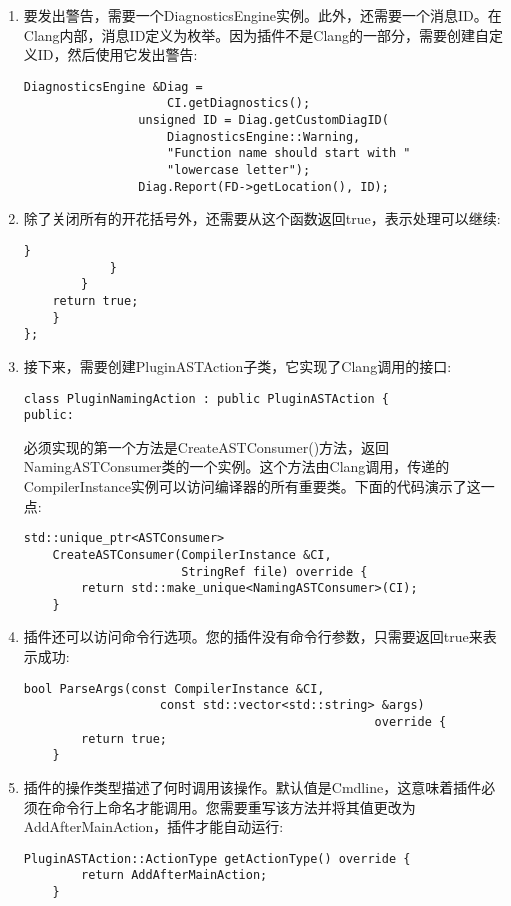 \begin{enumerate}
\item 要发出警告，需要一个DiagnosticsEngine实例。此外，还需要一个消息ID。在Clang内部，消息ID定义为枚举。因为插件不是Clang的一部分，需要创建自定义ID，然后使用它发出警告:
\begin{lstlisting}[caption={}]
				DiagnosticsEngine &Diag =
					CI.getDiagnostics();
				unsigned ID = Diag.getCustomDiagID(
					DiagnosticsEngine::Warning,
					"Function name should start with "
					"lowercase letter");
				Diag.Report(FD->getLocation(), ID);
\end{lstlisting}

\item 除了关闭所有的开花括号外，还需要从这个函数返回true，表示处理可以继续:
\begin{lstlisting}[caption={}]
				}
			}
		}
	return true;
	}
};
\end{lstlisting}

\item 接下来，需要创建PluginASTAction子类，它实现了Clang调用的接口:
\begin{lstlisting}[caption={}]
class PluginNamingAction : public PluginASTAction {
public:
\end{lstlisting}
必须实现的第一个方法是CreateASTConsumer()方法，返回NamingASTConsumer类的一个实例。这个方法由Clang调用，传递的CompilerInstance实例可以访问编译器的所有重要类。下面的代码演示了这一点:
\begin{lstlisting}[caption={}]
	std::unique_ptr<ASTConsumer>
	CreateASTConsumer(CompilerInstance &CI,
					  StringRef file) override {
		return std::make_unique<NamingASTConsumer>(CI);
	}
\end{lstlisting}

\item 插件还可以访问命令行选项。您的插件没有命令行参数，只需要返回true来表示成功:
\begin{lstlisting}[caption={}]
	bool ParseArgs(const CompilerInstance &CI,
				   const std::vector<std::string> &args)
												 override {
		return true;
	}
\end{lstlisting}

\item 插件的操作类型描述了何时调用该操作。默认值是Cmdline，这意味着插件必须在命令行上命名才能调用。您需要重写该方法并将其值更改为AddAfterMainAction，插件才能自动运行:
\begin{lstlisting}[caption={}]
	PluginASTAction::ActionType getActionType() override {
		return AddAfterMainAction;
	}
\end{lstlisting}


\end{enumerate}
